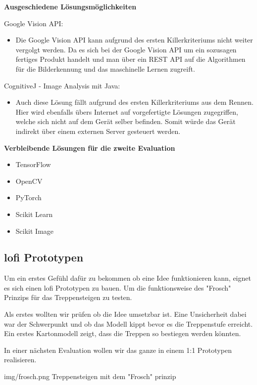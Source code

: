 \textbf{Ausgeschiedene Lösungsmöglichkeiten}

Google Vision API:
\begin{itemize}
    \item Die Google Vision API kann aufgrund des ersten Killerkriteriums nicht weiter vergolgt werden. Da es sich bei der Google Vision API um ein sozusagen fertiges Produkt handelt und man über ein REST API auf die Algorithmen für die Bilderkennung und das maschinelle Lernen zugreift.
\end{itemize}

CognitiveJ - Image Analysis mit Java:
\begin{itemize}
    \item Auch diese Lösung fällt aufgrund des ersten Killerkriteriums aus dem Rennen. Hier wird ebenfalls übers Internet auf vorgefertigte Lösungen zugegriffen, welche sich nicht auf dem Gerät selber befinden. Somit würde das Gerät indirekt über einem externen Server gesteuert werden.
\end{itemize}

\textbf{Verbleibende Lösungen für die zweite Evaluation}
\begin{itemize}
    \item TensorFlow 
    \item OpenCV
    \item PyTorch
    \item Scikit Learn
    \item Scikit Image
\end{itemize}

\subsection{\acrshort{lofi} Prototypen}

Um ein erstes Gefühl dafür zu bekommen ob eine Idee funktionieren kann, eignet es 
sich einen \acrfull{lofi} Prototypen zu bauen. Um die funktionsweise
des "Frosch" Prinzips für das Treppensteigen zu testen.

Als erstes wollten wir prüfen ob die Idee umsetzbar ist.
Eine Unsicherheit dabei war der Schwerpunkt und ob das Modell kippt
bevor es die Treppenstufe erreicht. Ein erstes Kartonmodell zeigt,
dass die Treppen so bestiegen werden könnten.

In einer nächsten Evaluation wollen wir das ganze in einem 1:1 Prototypen
realisieren.

\image
 {img/frosch.png}
 {Treppensteigen mit dem "Frosch" prinzip}